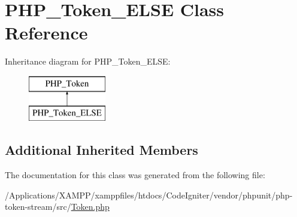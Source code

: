 \hypertarget{class_p_h_p___token___e_l_s_e}{}\section{P\+H\+P\+\_\+\+Token\+\_\+\+E\+L\+SE Class Reference}
\label{class_p_h_p___token___e_l_s_e}
Inheritance diagram for P\+H\+P\+\_\+\+Token\+\_\+\+E\+L\+SE\+:\begin{figure}[H]
\begin{center}
\leavevmode
\includegraphics[height=2.000000cm]{class_p_h_p___token___e_l_s_e}
\end{center}
\end{figure}
\subsection*{Additional Inherited Members}


The documentation for this class was generated from the following file\+:\begin{DoxyCompactItemize}
\item 
/\+Applications/\+X\+A\+M\+P\+P/xamppfiles/htdocs/\+Code\+Igniter/vendor/phpunit/php-\/token-\/stream/src/\mbox{\hyperlink{_token_8php}{Token.\+php}}\end{DoxyCompactItemize}
